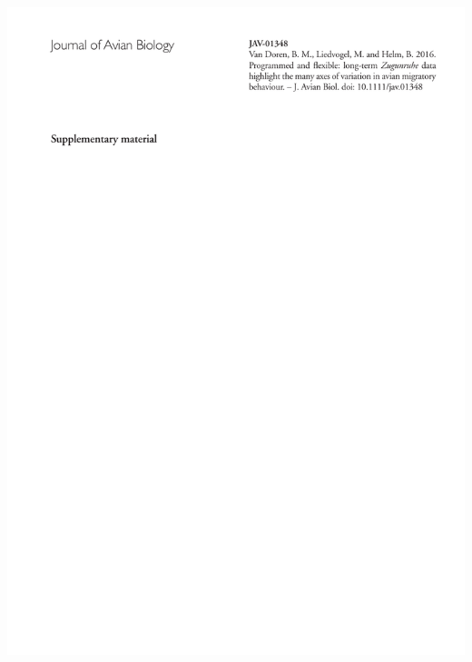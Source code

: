 \documentclass[a4paper, twoside]{templates/ociamthesis}
\begin{document}
\includegraphics[width=1\linewidth]{pdf_chapters/zug/zug_supp_crop_Part01}
\end{document}

